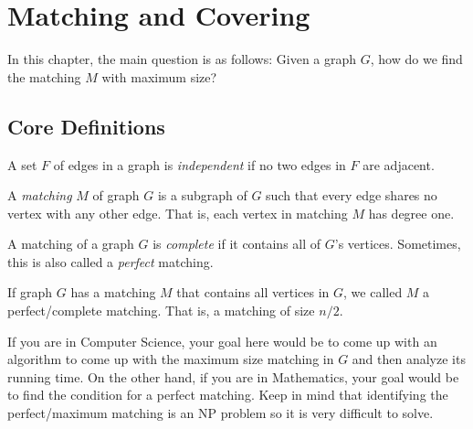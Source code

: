 \chapter{Matching and Covering}

In this chapter, the main question is as follows: Given a graph \(G\), how do we
find the matching \(M\) with maximum size?

\section{Core Definitions}

\begin{definition}
  A set \(F\) of edges in a graph is \textit{independent} if no two edges in
  \(F\) are adjacent.
\end{definition}

\begin{definition}[Matching]
  A \textit{matching} \(M\) of graph \(G\) is a subgraph of \(G\) such that
  every edge shares no vertex with any other edge. That is, each vertex in
  matching \(M\) has degree one.
\end{definition}

\begin{definition}
  A matching of a graph \(G\) is \textit{complete} if it contains all of \(G\)'s
  vertices. Sometimes, this is also called a \textit{perfect} matching.
\end{definition}

\begin{remark}
  If graph \(G\) has a matching \(M\) that contains all vertices in \(G\), we
  called \(M\) a perfect/complete matching. That is, a matching of size \(n/2\).
\end{remark}

If you are in Computer Science, your goal here would be to come up with an
algorithm to come up with the maximum size matching in \(G\) and then analyze
its running time. On the other hand, if you are in Mathematics, your goal would
be to find the condition for a perfect matching. Keep in mind that identifying
the perfect/maximum matching is an NP problem so it is very difficult to solve. 
